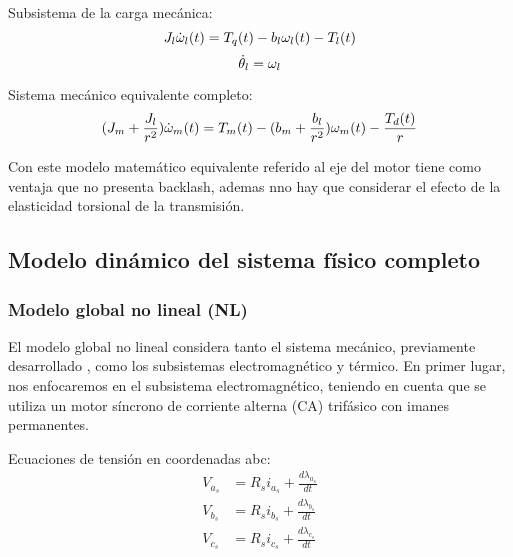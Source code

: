 \documentclass{article}
\begin{document}
Subsistema de la carga mecánica:
\begin{equation}
    \label{eq:3.1}
    J_{l}\dot{\omega}_{l}(t) = T_{q}(t)-b_{l}\omega_{l}(t)-T_{l}(t) \\
\end{equation}
\begin{equation}
    \label{eq:3.2}
    \dot{\theta}_{l} = \omega_{l}\\
\end{equation}

Sistema mecánico equivalente completo:
\begin{equation}
    \label{eq:4.1}
    (J_{m}+\frac{J_{l}}{r^2})\dot{\omega}_{m}(t) = T_{m}(t)-(b_{m}+\frac{b_{l}}{r^2})\omega_{m}(t)-\frac{T_{d}(t)}{r} \\
\end{equation}

Con este modelo matemático equivalente referido al eje del motor tiene como 
ventaja que no presenta backlash, ademas nno hay que considerar el efecto de 
la elasticidad torsional de la transmisión.

\subsection*{Modelo dinámico del sistema físico completo}
\subsubsection*{Modelo global no lineal (NL)}

El modelo global no lineal considera tanto el sistema mecánico, previamente desarrollado
, como los subsistemas electromagnético y térmico. 
En primer lugar, nos enfocaremos en el subsistema electromagnético, teniendo en cuenta que 
se utiliza un motor síncrono de corriente alterna (CA) trifásico con imanes permanentes.

Ecuaciones de tensión en coordenadas abc:
\begin{equation}
    \begin{aligned}
        V_{a_{s}} &= R_{s}i_{a_{s}} + \frac{d\lambda_{a_{s}}}{dt}\\
        V_{b_{s}} &= R_{s}i_{b_{s}} + \frac{d\lambda_{b_{s}}}{dt}\\
        V_{c_{s}} &= R_{s}i_{c_{s}} + \frac{d\lambda_{c_{s}}}{dt}\\
    \end{aligned}
\end{equation}
\end{document}
